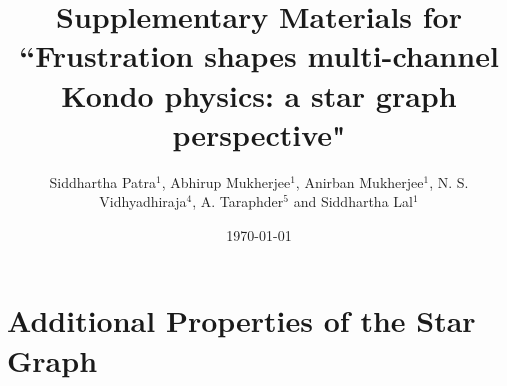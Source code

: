 \documentclass[12pt]{iopart}
\begin{document}
\title{Supplementary Materials for ``Frustration shapes multi-channel Kondo physics: a star graph perspective"}

\author{Siddhartha Patra$^1$, Abhirup Mukherjee$^1$, Anirban Mukherjee$^1$, N. S. Vidhyadhiraja$^4$, A. Taraphder$^5$ and Siddhartha Lal$^1$}

\address{$^1$Department of Physical Sciences, Indian Institute of Science Education and Research-Kolkata, W.B. 741246, India}

\address{$^4$Theoretical Sciences Unit, Jawaharlal Nehru Center for Advanced Scientific Research, Jakkur, Bengaluru 560064, India}

\address{$^5$Department of Physics, Indian Institute of Technology Kharagpur, Kharagpur 721302, India}

\date{\today}

\section{Additional Properties of the Star Graph}
\end{document}
